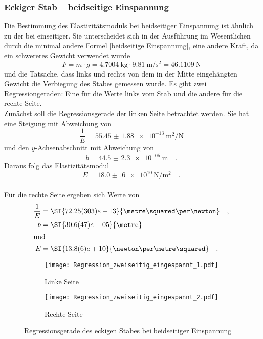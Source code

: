 \subsubsection{Eckiger Stab -- beidseitige Einspannung}
Die Bestimmung des Elastizitätsmoduls bei beidseitiger Einspannung ist ähnlich zu der bei einseitiger. Sie unterscheidet sich in der Ausführung im Wesentlichen durch die minimal andere Formel \ref{beidseitige Einspannung}, eine andere Kraft, da ein schwereres Gewicht verwendet wurde
\begin{equation}
  F = m \cdot g = \SI{4.7004}{\kilo\gram} \cdot \SI{9.81}{\metre\per\second\squared} = \SI{46.1109}{\newton}
\end{equation}
und die Tatsache, dass links und rechts von dem in der Mitte eingehängten Gewicht die Verbiegung des Stabes gemessen wurde. Es gibt zwei Regressiongeraden: Eine für die Werte links vom Stab und die andere für die rechte Seite. \\
Zunächst soll die Regressionsgerade der linken Seite betrachtet werden. Sie hat eine Steigung mit Abweichung von
\begin{equation}
  \frac{1}{E}= \SI{55.45(188)e-13}{\metre\squared\per\newton}
\end{equation}
und den $y$-Achsenabschnitt mit Abweichung von
\begin{equation}
  b = \SI{44.5(23)e-05}{\metre} \quad.
\end{equation}
Daraus folg das Elastizitätsmodul
\begin{equation}
  E = \SI{18.0(6)e+10}{\newton\per\metre\squared} \quad.
\end{equation}
\\
Für die rechte Seite ergeben sich Werte von
\begin{align}
  \frac{1}{E} &= \SI{72.25(303)e-13}{\metre\squared\per\newton} \quad,\\
  b &= \SI{30.6(47)e-05}{\metre} \\
  \intertext{und}
  E &= \SI{13.8(6)e+10}{\newton\per\metre\squared} \quad.
\end{align}

\begin{figure}
\centering
\begin{subfigure}{0.49\textwidth}
\centering
\texttt{[image: Regression\_zweiseitig\_eingespannt\_1.pdf]}
\caption{Linke Seite}
\end{subfigure}
\begin{subfigure}{0.49\textwidth}
\centering
\texttt{[image: Regression\_zweiseitig\_eingespannt\_2.pdf]}
\caption{Rechte Seite}
\end{subfigure}
\caption{Regressionsgerade des eckigen Stabes bei beidseitiger Einspannung}
\end{figure}


